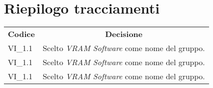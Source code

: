 
\section{Riepilogo tracciamenti}
\begin{longtable} {
		>{\centering}p{17mm} 
		>{}p{120mm}}
	\rowcolor{gray!50}
	\textbf{Codice} & \multicolumn{1}{c}{\textbf{Decisione}} \\%
	VI\_1.1 & Scelto \textit{VRAM Software} come nome del gruppo. \TBstrut \\ [2mm]
	VI\_1.1 & Scelto \textit{VRAM Software} come nome del gruppo. \TBstrut \\ [2mm]
	VI\_1.1 & Scelto \textit{VRAM Software} come nome del gruppo. \TBstrut \\ [2mm]
	
\end{longtable}